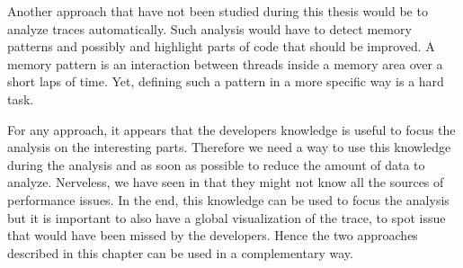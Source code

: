 Another approach that have not been studied during this thesis would be to analyze traces automatically.
Such analysis would have to detect memory patterns and possibly and highlight parts of code that should be improved.
A memory pattern is an interaction between threads inside a memory area over a short laps of time.
Yet, defining such a pattern in a more specific way is a hard task.

For any approach, it appears that the developers knowledge is useful to focus the analysis on the interesting parts.
Therefore we need a way to use this knowledge during the analysis and as soon as possible to reduce the amount of data to analyze.
Nerveless, we have seen in  that they might not know all the sources of performance issues.
In the end, this knowledge can be used to focus the analysis but it is important to also have a global visualization of the trace, to spot issue that would have been missed by the developers.
Hence the two approaches described in this chapter can be used in a complementary way.
